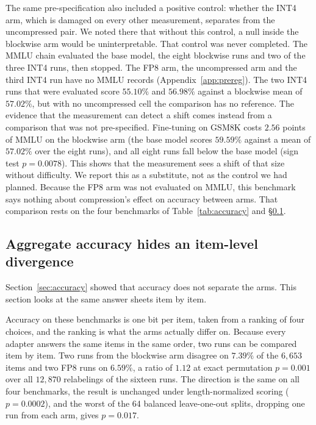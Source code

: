 \documentclass[11pt,letterpaper]{article}
\begin{document}
The same pre-specification also included a positive control: whether the INT4 arm, which is damaged on every other measurement, separates from the uncompressed pair. We noted there that without this control, a null inside the blockwise arm would be uninterpretable. That control was never completed. The MMLU chain evaluated the base model, the eight blockwise runs and two of the three INT4 runs, then stopped. The FP8 arm, the uncompressed arm and the third INT4 run have no MMLU records (Appendix~\ref{app:prereg}). The two INT4 runs that were evaluated score $55.10\%$ and $56.98\%$ against a blockwise mean of $57.02\%$, but with no uncompressed cell the comparison has no reference. The evidence that the measurement can detect a shift comes instead from a comparison that was not pre-specified. Fine-tuning on GSM8K costs $2.56$ points of MMLU on the blockwise arm (the base model scores $59.59\%$ against a mean of $57.02\%$ over the eight runs), and all eight runs fall below the base model (sign test $p = 0.0078$). This shows that the measurement sees a shift of that size without difficulty. We report this as a substitute, not as the control we had planned. Because the FP8 arm was not evaluated on MMLU, this benchmark says nothing about compression's effect on accuracy between arms. That comparison rests on the four benchmarks of Table~\ref{tab:accuracy} and \S\ref{sec:items}.

\subsection{Aggregate accuracy hides an item-level divergence}
\label{sec:items}

Section~\ref{sec:accuracy} showed that accuracy does not separate the arms. This section looks at the same answer sheets item by item.

Accuracy on these benchmarks is one bit per item, taken from a ranking of four choices, and the ranking is what the arms actually differ on. Because every adapter answers the same items in the same order, two runs can be compared item by item. Two runs from the blockwise arm disagree on $7.39\%$ of the $6{,}653$ items and two FP8 runs on $6.59\%$, a ratio of $1.12$ at exact permutation $p = 0.001$ over all $12{,}870$ relabelings of the sixteen runs. The direction is the same on all four benchmarks, the result is unchanged under length-normalized scoring ($p = 0.0002$), and the worst of the 64 balanced leave-one-out splits, dropping one run from each arm, gives $p = 0.017$.
\end{document}
